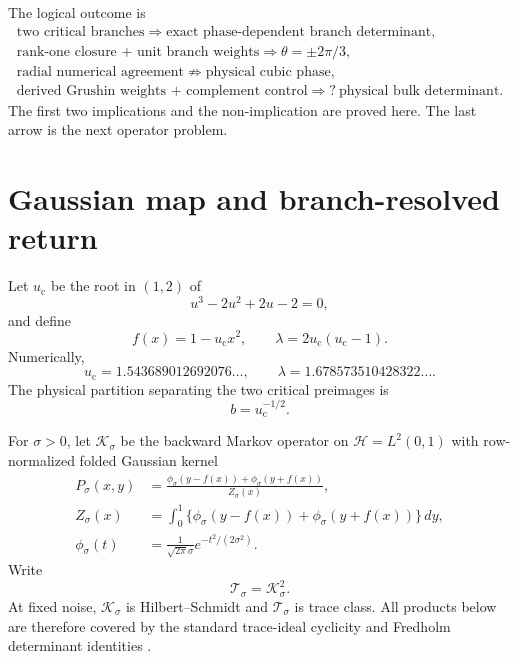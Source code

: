 \documentclass[11pt]{article}
\theoremstyle{definition}
\theoremstyle{remark}
\newcommand{\uc}{u_{\mathrm c}}
\newcommand{\cK}{\mathcal K}
\newcommand{\cT}{\mathcal T}
\newcommand{\cH}{\mathcal H}
\begin{document}
The logical outcome is
\begin{equation}\label{eq:logical-outcome}
 \boxed{
 \begin{gathered}
 \text{two critical branches}
 \Longrightarrow
 \text{exact phase-dependent branch determinant},\\
 \text{rank-one closure + unit branch weights}
 \Longrightarrow
 \theta=\pm2\pi/3,\\
 \text{radial numerical agreement}
 \not\Longrightarrow
 \text{physical cubic phase},\\
 \text{derived Grushin weights + complement control}
 \Longrightarrow?\
 \text{physical bulk determinant}.
 \end{gathered}}
\end{equation}
The first two implications and the non-implication are proved here.  The last
arrow is the next operator problem.

\section{Gaussian map and branch-resolved return}
\label{sec:setup}

Let $\uc$ be the root in $(1,2)$ of
\begin{equation}\label{eq:cubic-parameter}
 u^3-2u^2+2u-2=0,
\end{equation}
and define
\begin{equation}\label{eq:map-constants}
 f(x)=1-\uc x^2,
 \qquad
 \lambda=2\uc(\uc-1).
\end{equation}
Numerically,
\begin{equation}\label{eq:map-values}
 \uc=1.543689012692076\ldots,
 \qquad
 \lambda=1.678573510428322\ldots.
\end{equation}
The physical partition separating the two critical preimages is
\begin{equation}\label{eq:partition}
 b=\uc^{-1/2}.
\end{equation}

For $\sigma>0$, let $\cK_\sigma$ be the backward Markov operator on
$\cH=L^2(0,1)$ with row-normalized folded Gaussian kernel
\begin{align}
 P_\sigma(x,y)
 &=\frac{\phi_\sigma(y-f(x))+\phi_\sigma(y+f(x))}{Z_\sigma(x)},
 \label{eq:kernel}\\
 Z_\sigma(x)
 &=\int_0^1\{\phi_\sigma(y-f(x))+\phi_\sigma(y+f(x))\}\,dy,
 \label{eq:normalizer}\\
 \phi_\sigma(t)&=\frac{1}{\sqrt{2\pi}\sigma}
 e^{-t^2/(2\sigma^2)}.
 \label{eq:gaussian}
\end{align}
Write
\begin{equation}\label{eq:two-step}
 \cT_\sigma=\cK_\sigma^2.
\end{equation}
At fixed noise, $\cK_\sigma$ is Hilbert--Schmidt and $\cT_\sigma$ is trace
class.  All products below are therefore covered by the standard trace-ideal
cyclicity and Fredholm determinant identities
\citep{GohbergKrein1969,Simon2005}.
\end{document}
